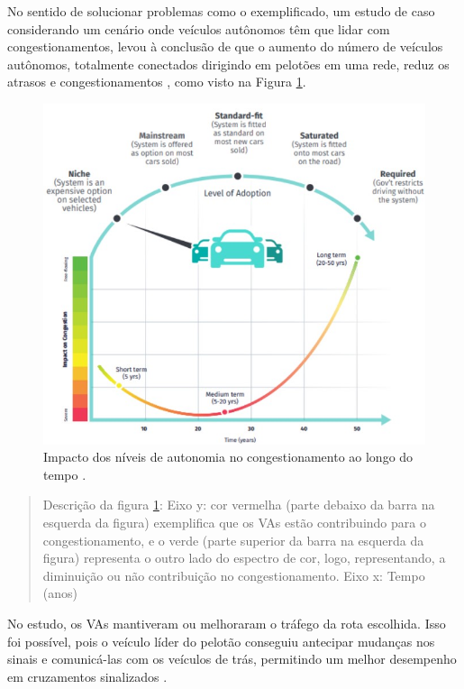 No sentido de solucionar problemas como o exemplificado, um estudo de caso considerando um cenário onde veículos autônomos têm que lidar com congestionamentos, levou à conclusão de que o aumento do número de veículos autônomos, totalmente conectados dirigindo em pelotões em uma rede, reduz os atrasos e congestionamentos \cite{conge}, como visto na Figura \ref{congestionamento}.

\begin{figure}[H]
\centering
\includegraphics[width=15cm]{Figures/conge.jpg}
\caption{Impacto dos níveis de autonomia no congestionamento ao longo do tempo \cite{4cenarios_ocidental}.}
\label{congestionamento}
\end{figure}
\begin{quote}
Descrição da figura \ref{congestionamento}: Eixo y: cor vermelha (parte debaixo da barra na esquerda da figura) exemplifica que os VAs estão contribuindo para o congestionamento, e o verde (parte superior da barra na esquerda da figura) representa o outro lado do espectro de cor, logo, representando, a diminuição ou não contribuição no congestionamento. Eixo x: Tempo (anos)

\end{quote}

No estudo, os VAs mantiveram ou melhoraram o tráfego da rota escolhida. Isso foi possível, pois o veículo líder do pelotão conseguiu antecipar mudanças nos sinais e comunicá-las com os veículos de trás, permitindo um melhor desempenho em cruzamentos sinalizados \cite{conge}.

